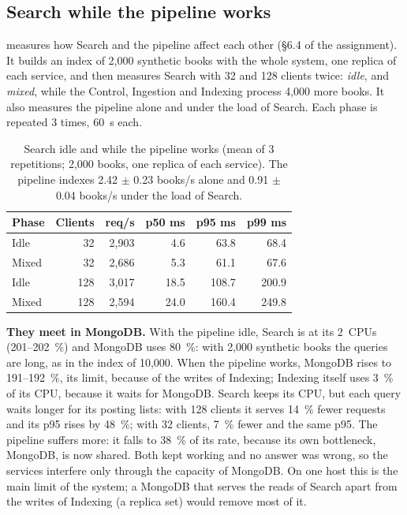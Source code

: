 \subsection{Search while the pipeline works}

 measures how Search and the pipeline affect each other (\S6.4 of the assignment). It builds an
index of 2,000 synthetic books with the whole system, one replica of each service, and then measures Search with 32 and
128 clients twice: \emph{idle}, and \emph{mixed}, while the Control, Ingestion and Indexing process 4,000 more books.
It also measures the pipeline alone and under the load of Search. Each phase is repeated 3 times, 60~s each.

\begin{table}[H]
\centering\small
\begin{tabular}{@{}lrrrrr@{}}
\toprule
\textbf{Phase} & \textbf{Clients} & \textbf{req/s} & \textbf{p50 ms} & \textbf{p95 ms} & \textbf{p99 ms} \\
\midrule
Idle & 32 & 2,903 & 4.6 & 63.8 & 68.4 \\
Mixed & 32 & 2,686 & 5.3 & 61.1 & 67.6 \\
Idle & 128 & 3,017 & 18.5 & 108.7 & 200.9 \\
Mixed & 128 & 2,594 & 24.0 & 160.4 & 249.8 \\
\bottomrule
\end{tabular}
\caption{Search idle and while the pipeline works (mean of 3 repetitions; 2,000 books, one replica of each service).
The pipeline indexes 2.42 $\pm$ 0.23 books/s alone and 0.91 $\pm$ 0.04 books/s under the load of Search.}
\label{tab:mixed}
\end{table}

\textbf{They meet in MongoDB.} With the pipeline idle, Search is at its 2~CPUs (201--202~\%) and MongoDB uses 80~\%:
with 2,000 synthetic books the queries are long, as in the index of 10,000. When the pipeline works, MongoDB rises to
191--192~\%, its limit, because of the writes of Indexing; Indexing itself uses 3~\% of its CPU, because it waits for
MongoDB. Search keeps its CPU, but each query waits longer for its posting lists: with 128 clients it serves 14~\%
fewer requests and its p95 rises by 48~\%; with 32 clients, 7~\% fewer and the same p95. The pipeline suffers more: it
falls to 38~\% of its rate, because its own bottleneck, MongoDB, is now shared. Both kept working and no answer was
wrong, so the services interfere only through the capacity of MongoDB. On one host this is the main limit of the
system; a MongoDB that serves the reads of Search apart from the writes of Indexing (a replica set) would remove most
of it.
